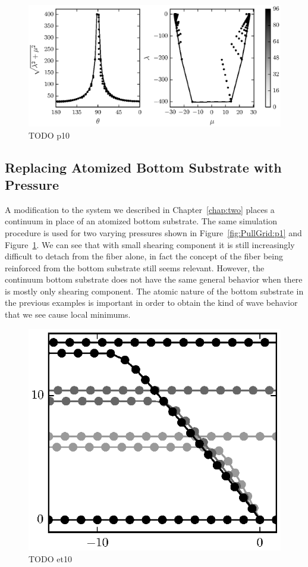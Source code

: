 	\begin{figure}
		\begin{center}
			\includegraphics{./fig/ch3/pull/p10/grid.eps}
		\end{center}		
		\caption{ TODO p10
		\label{fig:PullGrid:p10}}
	\end{figure}

\subsection{Replacing Atomized Bottom Substrate with Pressure} \label{section:detachment:pressure}

A modification to the system we described in Chapter~\ref{chap:two} places a continuum in place of an atomized bottom substrate. The same simulation procedure is used for two varying pressures shown in Figure~\ref{fig:PullGrid:p1} and Figure~\ref{fig:PullGrid:p10}. We can see that with small shearing component it is still increasingly difficult to detach from the fiber alone, in fact the concept of the fiber being reinforced from the bottom substrate still seems relevant. However, the continuum bottom substrate does not have the same general behavior when there is mostly only shearing component. The atomic nature of the bottom substrate in the previous examples is important in order to obtain the kind of wave behavior that we see cause local minimums.

	\begin{figure}
		\begin{center}
			\includegraphics{./fig/ch3/pull/unzip_anim.eps}
		\end{center}		
		\caption{ TODO et10
		\label{fig:PullGri}}
	\end{figure}